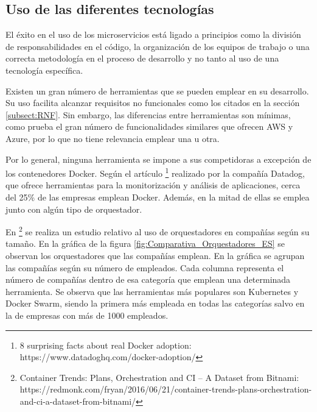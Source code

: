 \documentclass[11pt,spanish,listoffigures]{tfgetsinf}
\begin{document}
\subsection{Uso de las diferentes tecnologías}

El éxito en el uso de los microservicios está ligado a principios como la división de responsabilidades en el código, la organización de los equipos de trabajo o una correcta metodología en el proceso de desarrollo y no tanto al uso de una tecnología específica. 

Existen un gran número de herramientas que se pueden emplear en su desarrollo. Su uso facilita alcanzar requisitos no funcionales como los citados en la sección \ref{subsect:RNF}. Sin embargo, las diferencias entre herramientas son mínimas, como prueba el gran número de funcionalidades similares que ofrecen AWS y Azure, por lo que no tiene relevancia emplear una u otra. 

Por lo general, ninguna herramienta se impone a sus competidoras a excepción de los contenedores Docker. Según el artículo \footnote{ 8 surprising facts about real Docker adoption: https://www.datadoghq.com/docker-adoption/} realizado por la compañía Datadog, que ofrece herramientas para la monitorización y análisis de aplicaciones, cerca del 25\% de las empresas emplean Docker. Además, en la mitad de ellas se emplea junto con algún tipo de orquestador. 

En \footnote{ Container Trends: Plans, Orchestration and CI – A Dataset from Bitnami: https://redmonk.com/fryan/2016/06/21/container-trends-plans-orchestration-and-ci-a-dataset-from-bitnami/} se realiza un estudio relativo al uso de orquestadores en compañías según su tamaño. En la gráfica de la figura \ref{fig:Comparativa_Orquestadores_ES} se observan los orquestadores que las compañías emplean. En la gráfica se agrupan las compañías según su número de empleados. Cada columna representa el número de compañías dentro de esa categoría que emplean una determinada herramienta. Se observa que las herramientas más populares son Kubernetes y Docker Swarm, siendo la primera más empleada en todas las categorías salvo en la de empresas con más de 1000 empleados.
\end{document}
